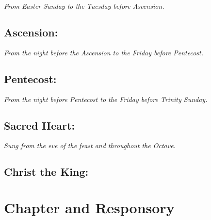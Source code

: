 \documentclass[a5paper,12pt,twoside,openany]{memoir}
\newcommand\rubrics[1]{\textit{#1}}
\begin{document}
\rubrics{From Easter Sunday to the Tuesday before Ascension.}


\section{Ascension:}

\rubrics{From the night before the Ascension to the Friday before Pentecost.}


\section{Pentecost:}

\rubrics{From the night before Pentecost to the Friday before Trinity Sunday.}





\section{Sacred Heart:}

\rubrics{Sung from the eve of the feast and throughout the Octave.}


\section{Christ the King:}


\chapter{Chapter and Responsory}
\end{document}
